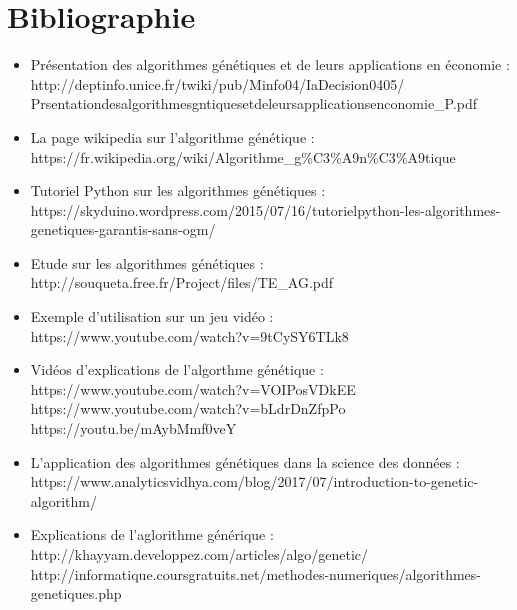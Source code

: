 \documentclass[a4paper,11pt]{article}
\begin{document}
	\section{Bibliographie}
	\begin{itemize}
		\item Présentation des algorithmes génétiques et de leurs applications en économie :\\
		http://deptinfo.unice.fr/twiki/pub/Minfo04/IaDecision0405/ \\
		Prsentationdesalgorithmesgntiquesetdeleursapplicationsenconomie\_P.pdf\\

		\item La page wikipedia sur l'algorithme génétique : \\
		https://fr.wikipedia.org/wiki/Algorithme\_g$\%$C3$\%$A9n$\%$C3$\%$A9tique\\

		\item Tutoriel Python sur les algorithmes génétiques :\\
		https://skyduino.wordpress.com/2015/07/16/tutorielpython-les-algorithmes-genetiques-garantis-sans-ogm/\\

		\item Etude sur les algorithmes génétiques :\\
		http://souqueta.free.fr/Project/files/TE\_AG.pdf
		
		\item Exemple d'utilisation sur un jeu vidéo :\\
		https://www.youtube.com/watch?v=9tCySY6TLk8\\

		\item Vidéos d'explications de l'algorthme génétique :\\
		https://www.youtube.com/watch?v=VOIPosVDkEE\\
		https://www.youtube.com/watch?v=bLdrDnZfpPo\\
		https://youtu.be/mAybMmf0veY\\

		\item L'application des algorithmes génétiques dans la science des données :\\
		https://www.analyticsvidhya.com/blog/2017/07/introduction-to-genetic-algorithm/ 

		\item Explications de l’aglorithme générique :\\
		http://khayyam.developpez.com/articles/algo/genetic/\\
		http://informatique.coursgratuits.net/methodes-numeriques/algorithmes-genetiques.php


\end{itemize}
\end{document}
